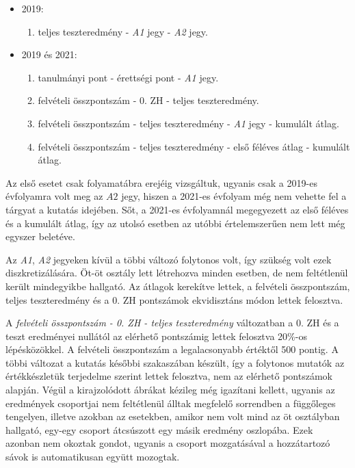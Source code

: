 \documentclass[12pt]{article}
\begin{document}
\begin{itemize}

\item 2019:

\begin{enumerate}
\item teljes teszteredmény - \textit{A1} jegy - \textit{A2} jegy.
\end{enumerate}

\item 2019 és 2021:

\begin{enumerate}
\item tanulmányi pont - érettségi pont - \textit{A1} jegy.
\item felvételi összpontszám - 0. ZH - teljes teszteredmény.
\item felvételi összpontszám - teljes teszteredmény - \textit{A1} jegy - kumulált átlag.
\item felvételi összpontszám - teljes teszteredmény - első féléves átlag - kumulált átlag.
\end{enumerate}

\end{itemize}

Az első esetet csak folyamatábra erejéig vizsgáltuk, ugyanis csak a 2019-es évfolyamra volt meg az $A2$ jegy, hiszen a 2021-es évfolyam még nem vehette fel a tárgyat a kutatás idejében. Sőt, a 2021-es évfolyamnál megegyezett az első féléves és a kumulált átlag, így az utolsó esetben az utóbbi értelemszerűen nem lett még egyszer beletéve.

Az \textit{A1}, \textit{A2} jegyeken kívül a többi változó folytonos volt, így szükség volt ezek diszkretizálására. Öt-öt osztály lett létrehozva minden esetben, de nem feltétlenül került mindegyikbe hallgató. Az átlagok kerekítve lettek, a felvételi összpontszám, teljes teszteredmény és a 0. ZH pontszámok ekvidisztáns módon lettek felosztva.

A \textit{felvételi összpontszám - 0. ZH - teljes teszteredmény} változatban a 0. ZH és a teszt eredményei nullától az elérhető pontszámig lettek felosztva 20\%-os lépésközökkel. A felvételi összpontszám a legalacsonyabb értéktől 500 pontig. A többi változat a kutatás későbbi szakaszában készült, így a folytonos mutatók az értékkészletük terjedelme szerint lettek felosztva, nem az elérhető pontszámok alapján. Végül a kirajzolódott ábrákat kézileg még igazítani kellett, ugyanis az eredmények csoportjai nem feltétlenül álltak megfelelő sorrendben a függőleges tengelyen, illetve azokban az esetekben, amikor nem volt mind az öt osztályban hallgató, egy-egy csoport átcsúszott egy másik eredmény oszlopába. Ezek azonban nem okoztak gondot, ugyanis a csoport mozgatásával a hozzátartozó sávok is automatikusan együtt mozogtak.
\end{document}
